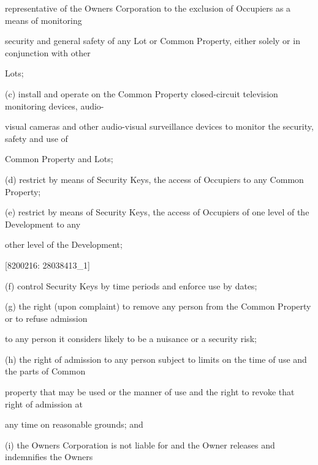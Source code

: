\documentclass{article}
\begin{document}
{\fontsize{10.02}{1}representative of the Owners Corporation to the exclusion of Occupiers as a means of monitoring }

{\fontsize{10.02}{1}security and general safety of any Lot or Common Property, either solely or in conjunction with other }

{\fontsize{10.02}{1}Lots; }

{\fontsize{9.962}{1}(c) install and operate on the Common Property closed-circuit television monitoring devices, audio- }

{\fontsize{10.02}{1}visual cameras and other audio-visual surveillance devices to monitor the security, safety and use of }

{\fontsize{10.02}{1}Common Property and Lots; }

{\fontsize{9.962}{1}(d) restrict by means of Security Keys, the access of Occupiers to any Common Property; }

{\fontsize{9.962}{1}(e) restrict by means of Security Keys, the access of Occupiers of one level of the Development to any }

{\fontsize{10.02}{1}other level of the Development; }

\newpage
















{\fontsize{7.02}{1}[8200216: 28038413\_1] }


{\fontsize{9.962}{1}(f) control Security Keys by time periods and enforce use by dates; }

{\fontsize{9.962}{1}(g) the right (upon complaint) to remove any person from the Common Property or to refuse admission }

{\fontsize{10.02}{1}to any person it considers likely to be a nuisance or a security risk; }

{\fontsize{9.962}{1}(h) the right of admission to any person subject to limits on the time of use and the parts of Common }

{\fontsize{10.02}{1}property that may be used or the manner of use and the right to revoke that right of admission at }

{\fontsize{10.02}{1}any time on reasonable grounds; and }

{\fontsize{9.962}{1}(i) the Owners Corporation is not liable for and the Owner releases and indemnifies the Owners }
\end{document}
